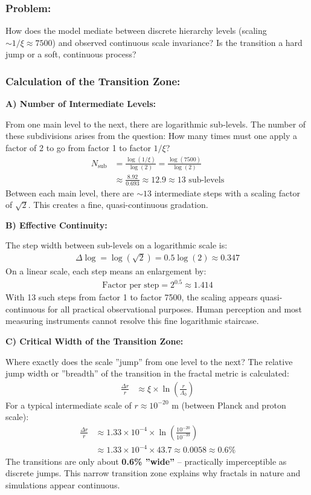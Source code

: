 \documentclass[12pt,a4paper]{article}
\begin{document}
	\subsubsection*{Problem:}
	How does the model mediate between discrete hierarchy levels (scaling $\sim 1/\xi \approx 7500$) and observed continuous scale invariance? Is the transition a hard jump or a soft, continuous process?
	
	\subsubsection*{Calculation of the Transition Zone:}
	
	\textbf{A) Number of Intermediate Levels:}
	
	From one main level to the next, there are logarithmic sub-levels. The number of these subdivisions arises from the question: How many times must one apply a factor of 2 to go from factor 1 to factor $1/\xi$?
	\begin{align*}
		N_{\text{sub}} &= \frac{\log(1/\xi)}{\log(2)} = \frac{\log(7500)}{\log(2)} \\
		&\approx \frac{8.92}{0.693} \approx 12.9 \approx 13 \text{ sub-levels}
	\end{align*}
	Between each main level, there are $\sim 13$ intermediate steps with a scaling factor of $\sqrt{2}$. This creates a fine, quasi-continuous gradation.
	
	\textbf{B) Effective Continuity:}
	
	The step width between sub-levels on a logarithmic scale is:
	\begin{align*}
		\Delta \log = \log(\sqrt{2}) = 0.5 \log(2) \approx 0.347
	\end{align*}
	On a linear scale, each step means an enlargement by:
	\begin{align*}
		\text{Factor per step} = 2^{0.5} \approx 1.414
	\end{align*}
	With 13 such steps from factor 1 to factor 7500, the scaling appears quasi-continuous for all practical observational purposes. Human perception and most measuring instruments cannot resolve this fine logarithmic staircase.
	
	\textbf{C) Critical Width of the Transition Zone:}
	
	Where exactly does the scale ''jump'' from one level to the next? The relative jump width or ''breadth'' of the transition in the fractal metric is calculated:
	\begin{align*}
		\frac{\Delta r}{r} &\approx \xi \times \ln\left(\frac{r}{\Lambda_0}\right)
	\end{align*}
	For a typical intermediate scale of $r \approx 10^{-20}$ m (between Planck and proton scale):
	\begin{align*}
		\frac{\Delta r}{r} &\approx 1.33 \times 10^{-4} \times \ln\left(\frac{10^{-20}}{10^{-39}}\right) \\
		&\approx 1.33 \times 10^{-4} \times 43.7 \approx 0.0058 \approx 0.6\%
	\end{align*}
	The transitions are only about \textbf{0.6\% ''wide''} – practically imperceptible as discrete jumps. This narrow transition zone explains why fractals in nature and simulations appear continuous.
	
\end{document}
